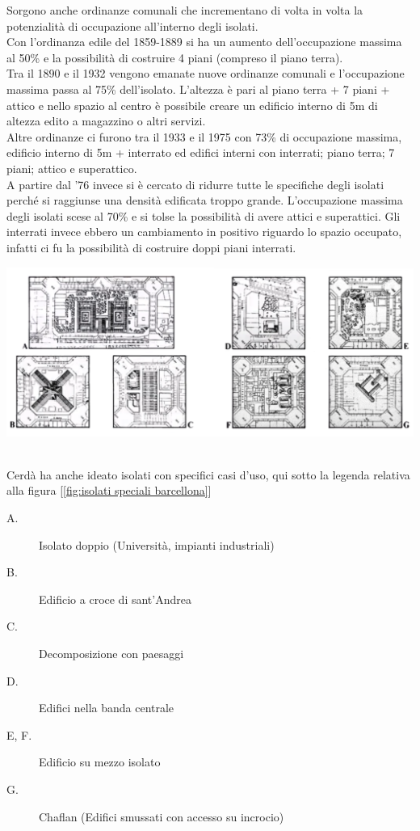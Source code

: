 \documentclass[a4paper,12pt, oneside]{book}
\begin{document}
    Sorgono anche ordinanze comunali che incrementano di volta in volta la potenzialità di occupazione all'interno degli isolati.\\
    Con l'ordinanza edile del 1859-1889 si ha un aumento dell'occupazione massima al 50\% e la possibilità di costruire 4 piani (compreso il piano terra).\\
    Tra il 1890 e il 1932 vengono emanate nuove ordinanze comunali e l'occupazione massima passa al 75\% dell'isolato. L'altezza è pari al piano terra + 7 piani + attico e nello spazio al centro è possibile creare un edificio interno di 5m di altezza edito a magazzino o altri servizi.\\
    Altre ordinanze ci furono tra il 1933 e il 1975 con 73\% di occupazione massima, edificio interno di 5m + interrato ed edifici interni con interrati; piano terra; 7 piani; attico e superattico.\\
    A partire dal '76 invece si è cercato di ridurre tutte le specifiche degli isolati perché si raggiunse una densità edificata troppo grande. L'occupazione massima degli isolati scese al 70\% e si tolse la possibilità di avere attici e superattici. Gli interrati invece ebbero un cambiamento in positivo riguardo lo spazio occupato, infatti ci fu la possibilità di costruire doppi piani interrati.\\
    \begin{center}
    	\includegraphics[width=1.0\linewidth]{"immagini/isolati speciali barcellona"}
    	\label{fig:isolati speciali barcellona}
    \end{center}
    \leavevmode\\
    Cerdà ha anche ideato isolati con specifici casi d'uso, qui sotto la legenda relativa alla figura [\ref{fig:isolati speciali barcellona}]\\
    \begin{description}
    	\item[A.    ] \phantom{a|}Isolato doppio (Università, impianti industriali)
    	\item[B.    ] \phantom{a|}Edificio a croce di sant'Andrea
    	\item[C.    ] \phantom{a|}Decomposizione con paesaggi
    	\item[D.    ] \phantom{a|}Edifici nella banda centrale
    	\item[E, F.]  \phantom{..}Edificio su mezzo isolato
    	\item[G.   ] \phantom{a|}Chaflan (Edifici smussati con accesso su incrocio)
    \end{description}
  
\end{document}
